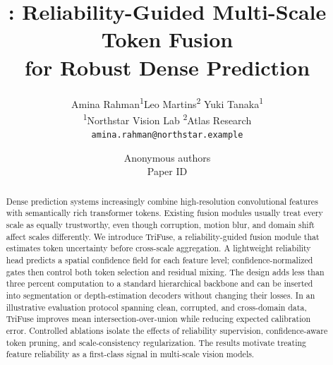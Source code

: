 \documentclass[10pt,twocolumn,letterpaper]{article}
\title{\method: Reliability-Guided Multi-Scale Token Fusion\\
for Robust Dense Prediction}
\author{Amina Rahman\textsuperscript{1}\quad Leo Martins\textsuperscript{2}\quad
          Yuki Tanaka\textsuperscript{1}\\
          \textsuperscript{1}Northstar Vision Lab \quad
          \textsuperscript{2}Atlas Research\\
          {\tt\small amina.rahman@northstar.example}}
\author{Anonymous authors\\Paper ID \paperid}
\date{}
\newif\ificcvfinal
\newcommand{\paperid}{0000}       %
\newcommand{\method}{TriFuse}
\newcommand{\reviewmark}{}
\newcommand{\reviewmark}{%
    \begin{tikzpicture}[remember picture,overlay]
      \node[anchor=north east,text=warmgray,font=\scriptsize]
        at ([xshift=-0.65in,yshift=-0.28in]current page.north east)
        {Unofficial review draft -- Paper \#\paperid};
    \end{tikzpicture}}
\begin{document}
\ificcvfinal\else\linenumbers\fi
\maketitle

\noindent{}
\vspace{0.8em}


\reviewmark
\thispagestyle{plain}

\begin{center}
\end{center}

\begin{abstract}
Dense prediction systems increasingly combine high-resolution convolutional
features with semantically rich transformer tokens. Existing fusion modules
usually treat every scale as equally trustworthy, even though corruption,
motion blur, and domain shift affect scales differently. We introduce
\method, a reliability-guided fusion module that estimates token uncertainty
before cross-scale aggregation. A lightweight reliability head predicts a
spatial confidence field for each feature level; confidence-normalized gates
then control both token selection and residual mixing. The design adds less
than three percent computation to a standard hierarchical backbone and can be
inserted into segmentation or depth-estimation decoders without changing their
losses. In an illustrative evaluation protocol spanning clean, corrupted, and
cross-domain data, \method{} improves mean intersection-over-union while reducing
expected calibration error. Controlled ablations isolate the effects of
reliability supervision, confidence-aware token pruning, and scale-consistency
regularization. The results motivate treating feature reliability as a
first-class signal in multi-scale vision models.
\end{abstract}
\end{document}
